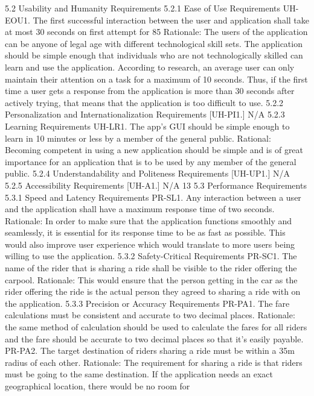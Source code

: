 5.2 Usability and Humanity Requirements
5.2.1 Ease of Use Requirements
UH-EOU1. The first successful interaction between the user and application shall take at most
30 seconds on first attempt for 85%
Rationale: The users of the application can be anyone of legal age with different technological
skill sets. The application should be simple enough that individuals who are not technologically skilled can learn and use the application. According to research, an average user can
only maintain their attention on a task for a maximum of 10 seconds. Thus, if the first time
a user gets a response from the application is more than 30 seconds after actively trying, that
means that the application is too difficult to use.
5.2.2 Personalization and Internationalization Requirements
[UH-PI1.] N/A
5.2.3 Learning Requirements
UH-LR1. The app’s GUI should be simple enough to learn in 10 minutes or less by a member
of the general public.
Rational: Becoming competent in using a new application should be simple and is of great
importance for an application that is to be used by any member of the general public.
5.2.4 Understandability and Politeness Requirements
[UH-UP1.] N/A
5.2.5 Accessibility Requirements
[UH-A1.] N/A
13
5.3 Performance Requirements
5.3.1 Speed and Latency Requirements
PR-SL1. Any interaction between a user and the application shall have a maximum response
time of two seconds.
Rationale: In order to make sure that the application functions smoothly and seamlessly, it is
essential for its response time to be as fast as possible. This would also improve user experience
which would translate to more users being willing to use the application.
5.3.2 Safety-Critical Requirements
PR-SC1. The name of the rider that is sharing a ride shall be visible to the rider offering the
carpool.
Rationale: This would ensure that the person getting in the car as the rider offering the ride
is the actual person they agreed to sharing a ride with on the application.
5.3.3 Precision or Accuracy Requirements
PR-PA1. The fare calculations must be consistent and accurate to two decimal places.
Rationale: the same method of calculation should be used to calculate the fares for all riders
and the fare should be accurate to two decimal places so that it’s easily payable.
PR-PA2. The target destination of riders sharing a ride must be within a 35m radius of each
other.
Rationale: The requirement for sharing a ride is that riders must be going to the same destination. If the application needs an exact geographical location, there would be no room for
